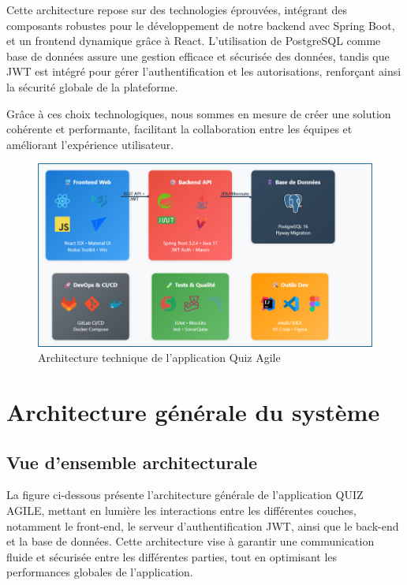\documentclass[12pt,a4paper]{report}
\begin{document}
Cette architecture repose sur des technologies éprouvées, intégrant des composants robustes pour le développement de notre backend avec Spring Boot, et un frontend dynamique grâce à React. L'utilisation de PostgreSQL comme base de données assure une gestion efficace et sécurisée des données, tandis que JWT est intégré pour gérer l'authentification et les autorisations, renforçant ainsi la sécurité globale de la plateforme.

Grâce à ces choix technologiques, nous sommes en mesure de créer une solution cohérente et performante, facilitant la collaboration entre les équipes et améliorant l'expérience utilisateur.

\begin{figure}[H]
\centering
\includegraphics[width=1.0\textwidth]{latex_media/media/architecture_technique_systeme.png}
\caption{Architecture technique de l'application Quiz Agile}
\label{fig:architecture-technique}
\end{figure}

\section{Architecture générale du système}

\subsection{Vue d'ensemble architecturale}

La figure ci-dessous présente l'architecture générale de l'application QUIZ AGILE, mettant en lumière les interactions entre les différentes couches, notamment le front-end, le serveur d'authentification JWT, ainsi que le back-end et la base de données. Cette architecture vise à garantir une communication fluide et sécurisée entre les différentes parties, tout en optimisant les performances globales de l'application.
\end{document}
